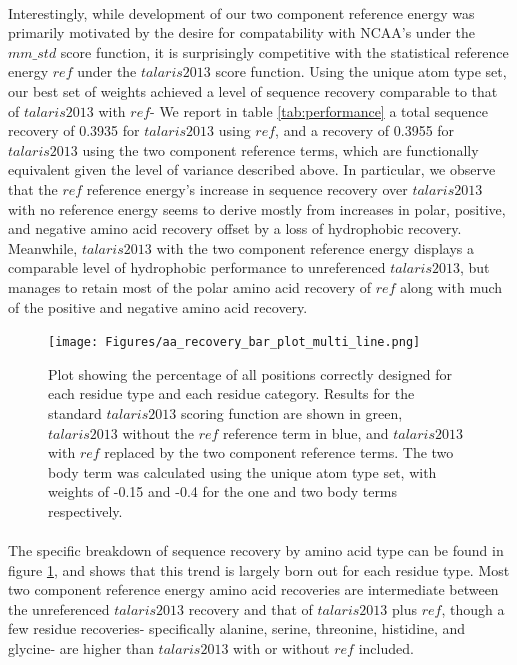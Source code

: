 \paragraph{}
Interestingly, while development of our two component reference energy was primarily motivated by the desire for compatability with NCAA's under the $mm\_std$ score function, it is surprisingly competitive with the statistical reference energy $ref$ under the $talaris2013$ score function.
Using the unique atom type set, our best set of weights achieved a level of sequence recovery comparable to that of $talaris2013$ with $ref$-
We report in table \ref{tab:performance} a total sequence recovery of 0.3935 for $talaris2013$ using $ref$, and a recovery of 0.3955 for $talaris2013$ using the two component reference terms, which are functionally equivalent given the level of variance described above.
In particular, we observe that the $ref$ reference energy's increase in sequence recovery over $talaris2013$ with no reference energy seems to derive mostly from increases in polar, positive, and negative amino acid recovery offset by a loss of hydrophobic recovery.
Meanwhile, $talaris2013$ with the two component reference energy displays a comparable level of hydrophobic performance to unreferenced $talaris2013$, but manages to retain most of the polar amino acid recovery of $ref$ along with much of the positive and negative amino acid recovery.

\begin{figure}[hbtp]
  \texttt{[image: Figures/aa\_recovery\_bar\_plot\_multi\_line.png]}
  \caption{Plot showing the percentage of all positions correctly designed for each residue type and each residue category.
Results for the standard $talaris2013$ scoring function are shown in green, $talaris2013$ without the $ref$ reference term in blue, and $talaris2013$ with $ref$ replaced by the two component reference terms.
The two body term was calculated using the unique atom type set, with weights of -0.15 and -0.4 for the one and two body terms respectively.}
  \label{fig:aa_recovery}
\end{figure}

\paragraph{}
The specific breakdown of sequence recovery by amino acid type can be found in figure \ref{fig:aa_recovery}, and shows that this trend is largely born out for each residue type.
Most two component reference energy amino acid recoveries are intermediate between the unreferenced $talaris2013$ recovery and that of $talaris2013$ plus $ref$, though a few residue recoveries- specifically alanine, serine, threonine, histidine, and glycine- are higher than $talaris2013$ with or without $ref$ included.





